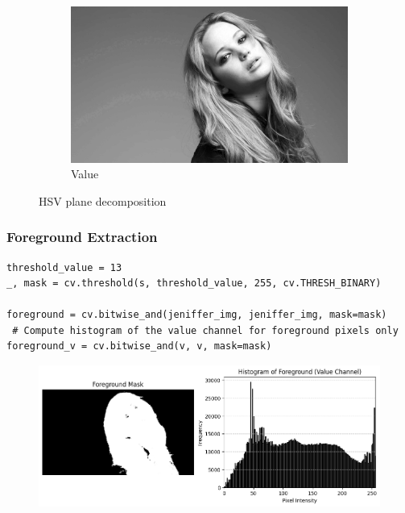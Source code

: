\documentclass[11pt]{article}
\begin{document}
\begin{figure}[H]
\begin{subfigure}{0.3\textwidth}
        \includegraphics[width=\textwidth]{resources/jeniffer_value.png}
        \caption{Value}
    \end{subfigure}
    \caption{HSV plane decomposition}
\end{figure}

\subsubsection*{Foreground Extraction}
\begin{lstlisting}[style=pythonstyle]
threshold_value = 13  
_, mask = cv.threshold(s, threshold_value, 255, cv.THRESH_BINARY)

foreground = cv.bitwise_and(jeniffer_img, jeniffer_img, mask=mask)
 # Compute histogram of the value channel for foreground pixels only
foreground_v = cv.bitwise_and(v, v, mask=mask)
\end{lstlisting}

\begin{figure}[H]
    \centering
    \includegraphics[width=0.8\linewidth]{resources/jeniffer_mask_hist.png}
    \label{fig:placeholder}
\end{figure}
\end{document}
